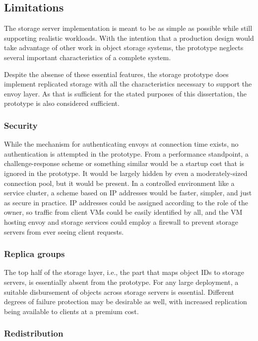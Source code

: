 \subsection{Limitations}

The storage server implementation is meant to be as simple as possible while still supporting realistic workloads. With the intention that a production design would take advantage of other work in object storage systems, the prototype neglects several important characteristics of a complete system.

Despite the absense of these essential features, the storage prototype does implement replicated storage with all the characteristics necessary to support the envoy layer. As that is sufficient for the stated purposes of this dissertation, the prototype is also considered sufficient.

\subsubsection{Security}

While the mechanism for authenticating envoys at connection time exists, no authentication is attempted in the prototype. From a performance standpoint, a challenge-response scheme or something similar would be a startup cost that is ignored in the prototype. It would be largely hidden by even a moderately-sized connection pool, but it would be present. In a controlled environment like a service cluster, a scheme based on IP addresses would be faster, simpler, and just as secure in practice. IP addresses could be assigned according to the role of the owner, so traffic from client VMs could be easily identified by all, and the VM hosting envoy and storage services could employ a firewall to prevent storage servers from ever seeing client requests.

\subsubsection{Replica groups}

The top half of the storage layer, i.e., the part that maps object IDs to storage servers, is essentially absent from the prototype. For any large deployment, a suitable disbursement of objects across storage servers is essential. Different degrees of failure protection may be desirable as well, with increased replication being available to clients at a premium cost.

\subsubsection{Redistribution}

